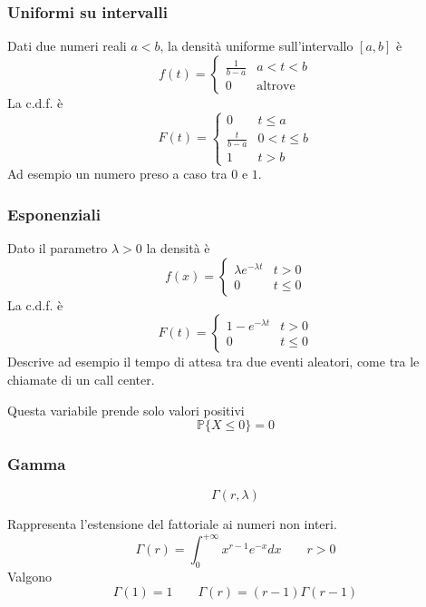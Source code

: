 \subsubsection{Uniformi su intervalli}
Dati due numeri reali $a < b$, la densità uniforme sull'intervallo $[a,b]$ è
\begin{equation}
	f(t) = \begin{cases}
		\frac{1}{b-a} & a < t < b\\
		0 & \text{altrove}
	\end{cases}
\end{equation}
La c.d.f. è
\begin{equation}
	F(t)=\begin{cases}
		0 & t \leq a \\
		\frac{t}{b-a} & 0 < t \leq b \\
		1 & t>b
	\end{cases}
\end{equation}
Ad esempio un numero preso a caso tra $0$ e $1$.

\subsubsection{Esponenziali}
Dato il parametro $\lambda>0$ la densità è
\begin{equation}
	f(x)=\begin{cases}
		\lambda e^{-\lambda t} & t >0 \\
		0 & t \leq 0
	\end{cases}
\end{equation}
La c.d.f. è
\begin{equation}
	F(t) = \begin{cases}
		1-e^{-\lambda t} & t>0\\
		0 & t \leq 0
	\end{cases}
\end{equation}
Descrive ad esempio il tempo di attesa tra due eventi aleatori, come tra le chiamate di un call center.
\begin{observation}
	Questa variabile prende solo valori positivi
	\begin{equation*}
		\mathbb{P}\{X \leq 0\}= 0
	\end{equation*}
\end{observation}

\subsubsection{Gamma}
\begin{equation}
	\Gamma(r, \lambda)
\end{equation}
\begin{definition}
	Rappresenta l'estensione del fattoriale ai numeri non interi.
	\begin{equation}
		\Gamma(r) = \int_{0}^{+\infty} x^{r-1}e^{-x}dx \quad\quad r>0
	\end{equation}
	Valgono
	\begin{equation*}
		\Gamma(1) = 1 \quad\quad \Gamma(r) = (r-1)\Gamma(r-1)
	\end{equation*}
\end{definition}

